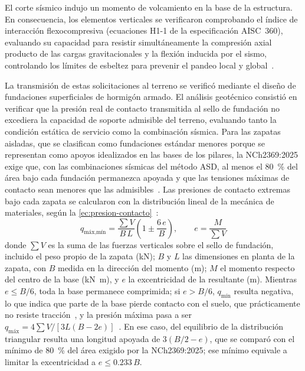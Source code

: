 El corte sísmico indujo un momento de volcamiento en la base de la estructura.
En consecuencia, los elementos verticales se verificaron comprobando el índice de interacción flexocompresiva (ecuaciones H1-1 de la especificación AISC~360), evaluando su capacidad para resistir simultáneamente la compresión axial producto de las cargas gravitacionales y la flexión inducida por el sismo, controlando los límites de esbeltez para prevenir el pandeo local y global~\parencite{aisc2016specification}.

La transmisión de estas solicitaciones al terreno se verificó mediante el diseño de fundaciones superficiales de hormigón armado.
El análisis geotécnico consistió en verificar que la presión real de contacto transmitida al sello de fundación no excediera la capacidad de soporte admisible del terreno, evaluando tanto la condición estática de servicio como la combinación sísmica.
Para las zapatas aisladas, que se clasifican como fundaciones estándar menores porque se representan como apoyos idealizados en las bases de los pilares, la NCh2369:2025 exige que, con las combinaciones sísmicas del método ASD, al menos el \qty{80}{\percent} del área bajo cada fundación permanezca apoyada y que las tensiones máximas de contacto sean menores que las admisibles~\parencite{inn2025nch2369}.
Las presiones de contacto extremas bajo cada zapata se calcularon con la distribución lineal de la mecánica de materiales, según la \cref{ec:presion-contacto}~\parencite{das2015fundamentos}:
\begin{equation}
  q_{\text{máx,mín}} = \frac{\sum V}{B\,L}\left(1 \pm \frac{6\,e}{B}\right), \qquad e = \frac{M}{\sum V}
  \label{ec:presion-contacto}
\end{equation}
donde $\sum V$ es la suma de las fuerzas verticales sobre el sello de fundación, incluido el peso propio de la zapata (\unit{\kilo\newton}); $B$ y $L$ las dimensiones en planta de la zapata, con $B$ medida en la dirección del momento (\unit{\meter}); $M$ el momento respecto del centro de la base (\unit{\kilo\newton\meter}), y $e$ la excentricidad de la resultante (\unit{\meter}).
Mientras $e \leq B/6$, toda la base permanece comprimida; si $e > B/6$, $q_{\text{mín}}$ resulta negativa, lo que indica que parte de la base pierde contacto con el suelo, que prácticamente no resiste tracción~\parencite{das2015fundamentos}, y la presión máxima pasa a ser $q_{\text{máx}} = 4\sum V/[3L(B - 2e)]$~\parencite{das2015fundamentos}.
En ese caso, del equilibrio de la distribución triangular resulta una longitud apoyada de $3(B/2 - e)$, que se comparó con el mínimo de \qty{80}{\percent} del área exigido por la NCh2369:2025; ese mínimo equivale a limitar la excentricidad a $e \leq \num{0.233}\,B$.

